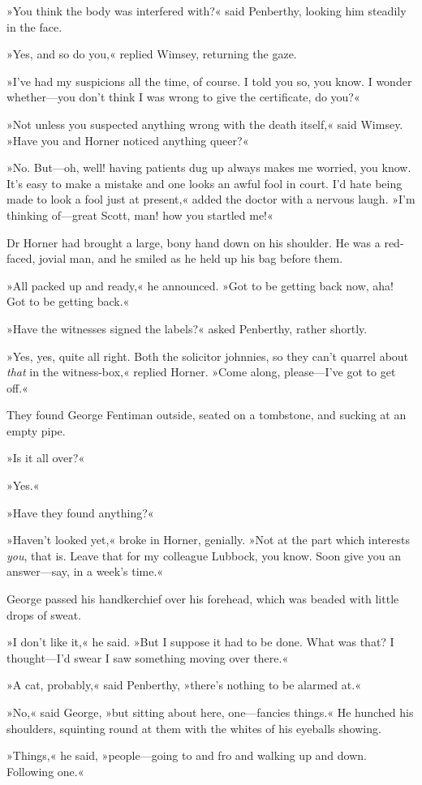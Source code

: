 »You think the body was interfered with?« said Penberthy, looking him steadily in the face.

»Yes, and so do you,« replied Wimsey, returning the gaze.

»I've had my suspicions all the time, of course. I told you so, you know. I wonder whether—you don't think I was wrong to give the certificate, do you?«

»Not unless you suspected anything wrong with the death itself,« said Wimsey. »Have you and Horner noticed anything queer?«

»No. But—oh, well! having patients dug up always makes me worried, you know. It's easy to make a mistake and one looks an awful fool in court. I'd hate being made to look a fool just at present,« added the doctor with a nervous laugh. »I'm thinking of—great Scott, man! how you startled me!«

Dr Horner had brought a large, bony hand down on his shoulder. He was a red-faced, jovial man, and he smiled as he held up his bag before them.

»All packed up and ready,« he announced. »Got to be getting back now, aha! Got to be getting back.«

»Have the witnesses signed the labels?« asked Penberthy, rather shortly.

»Yes, yes, quite all right. Both the solicitor johnnies, so they can't quarrel about \textit{that} in the witness-box,« replied Horner. »Come along, please—I've got to get off.«

They found George Fentiman outside, seated on a tombstone, and sucking at an empty pipe.

»Is it all over?«

»Yes.«

»Have they found anything?«

»Haven't looked yet,« broke in Horner, genially. »Not at the part which interests \textit{you}, that is. Leave that for my colleague Lubbock, you know. Soon give you an answer—say, in a week's time.«

George passed his handkerchief over his forehead, which was beaded with little drops of sweat.

»I don't like it,« he said. »But I suppose it had to be done. What was that? I thought—I'd swear I saw something moving over there.«

»A cat, probably,« said Penberthy, »there's nothing to be alarmed at.«

»No,« said George, »but sitting about here, one—fancies things.« He hunched his shoulders, squinting round at them with the whites of his eyeballs showing.

»Things,« he said, »people—going to and fro \textellipsis  and walking up and down. Following one.«